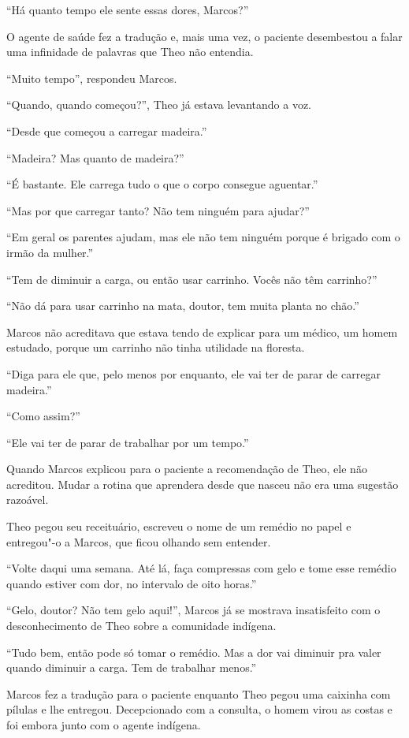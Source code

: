 ``Há quanto tempo ele sente essas dores, Marcos?''

O agente de saúde fez a tradução e, mais uma vez, o paciente desembestou a falar
uma infinidade de palavras que Theo não entendia.

``Muito tempo'', respondeu Marcos.

``Quando, quando começou?'', Theo já estava levantando a voz.

``Desde que começou a carregar madeira.''

``Madeira? Mas quanto de madeira?''

``É bastante. Ele carrega tudo o que o corpo consegue aguentar.''

``Mas por que carregar tanto? Não tem ninguém para ajudar?''

``Em geral os parentes ajudam, mas ele não tem ninguém porque é brigado
com o irmão da mulher.''

``Tem de diminuir a carga, ou então usar carrinho. Vocês não têm
carrinho?''

``Não dá para usar carrinho na mata, doutor, tem muita planta no chão.''

Marcos não acreditava que estava tendo de explicar para um médico, um
homem estudado, porque um carrinho não tinha utilidade na floresta.

``Diga para ele que, pelo menos por enquanto, ele vai ter de parar de
carregar madeira.''

``Como assim?''

``Ele vai ter de parar de trabalhar por um tempo.''

Quando Marcos explicou para o paciente a recomendação de Theo, ele não
acreditou. Mudar a rotina que aprendera desde que nasceu não era uma
sugestão razoável.

Theo pegou seu receituário, escreveu o nome de um remédio no papel e
entregou"-o a Marcos, que ficou olhando sem entender.

``Volte daqui uma semana. Até lá, faça compressas com gelo e tome esse
remédio quando estiver com dor, no intervalo de oito horas.''

``Gelo, doutor? Não tem gelo aqui!'', Marcos já se mostrava insatisfeito
com o desconhecimento de Theo sobre a comunidade indígena.

``Tudo bem, então pode só tomar o remédio. Mas a dor vai diminuir pra
valer quando diminuir a carga. Tem de trabalhar menos.''

Marcos fez a tradução para o paciente enquanto Theo pegou uma caixinha
com pílulas e lhe entregou. Decepcionado com a consulta, o homem virou
as costas e foi embora junto com o agente indígena.

